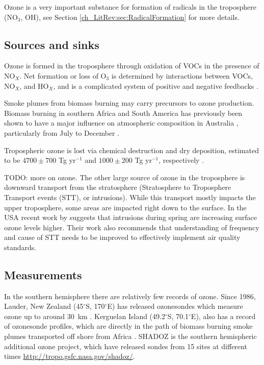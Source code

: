     Ozone is a very important substance for formation of radicals in the troposphere (NO$_3$, OH), see Section \ref{ch_LitRev:sec:RadicalFormation} for more details.
    
    
  \subsection{Sources and sinks}
  
    Ozone is formed in the troposphere through oxidation of VOCs in the presence of NO$_X$.
    Net formation or loss of O$_3$ is determined by interactions between VOCs, NO$_X$, and HO$_X$, and is a complicated system of positive and negative feedbacks \citep{Atkinson2000}.
    
    Smoke plumes from biomass burning may carry precursors to ozone production.
    Biomass burning in southern Africa and South America has previously been shown to have a major influence on atmospheric composition in Australia \citep{Oltmans2001, Gloudemans2006, Edwards2006}, particularly from July to December \citep{Pak2003, Liu2016}.

    Tropospheric ozone is lost via chemical destruction and dry deposition, estimated to be $4700\pm700$ Tg yr$^{-1}$ and $1000\pm200$ Tg yr$^{-1}$, respectively \citep{Stevenson2006}. 

    TODO: more on ozone.
    The other large source of ozone in the troposphere is downward transport from the stratosphere (Stratosphere to Troposphere Transport events (STT), or intrusions).
    While this transport mostly impacts the upper troposphere, some areas are impacted right down to the surface.
    In the USA recent work by \cite{Lin2015} suggests that intrusions during spring are increasing surface ozone levels higher.
    Their work also recommends that understanding of frequency and cause of STT needs to be improved to effectively implement air quality standards.
  
  \subsection{Measurements}
    
    In the southern hemisphere there are relatively few records of ozone.
    Since 1986, Lauder, New Zealand (45$^{\circ}$S, 170$^{\circ}$E) has released ozonesondes which measure ozone up to around 30~km \citep{Brinksma2002}.
    Kerguelan Island (49.2$^{\circ}$S, 70.1$^{\circ}$E), also has a record of ozonesonde profiles, which are directly in the path of biomass burning smoke plumes transported off shore from Africa \citep{Baray2012}.
    SHADOZ is the southern hemispheric additional ozone project, which have released sondes from 15 sites at different times \url{http://tropo.gsfc.nasa.gov/shadoz/}.
    
